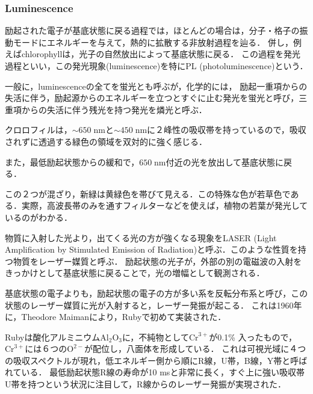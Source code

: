 \documentclass[uplatex, dvipdfmx]{jsreport}
\begin{document}
\subsubsection{Luminescence}
励起された電子が基底状態に戻る過程では，ほとんどの場合は，分子・格子の振動モードにエネルギーを与えて，熱的に拡散する非放射過程を辿る．
併し，例えばchlorophyllは，光子の自然放出によって基底状態に戻る．
この過程を発光過程といい，この発光現象(luminescence)を特にPL (photoluminescence)という．

\begin{definition}
    一般に，luminescenceの全てを蛍光とも呼ぶが，化学的には，
    励起一重項からの失活に伴う，励起源からのエネルギーを立つとすぐに止む発光を蛍光と呼び，三重項からの失活に伴う残光を持つ発光を燐光と呼ぶ．
\end{definition}

\begin{example}[chlorophyll]
    クロロフィルは，$\sim 650\;\mathrm{nm}$と$\sim 450\;\mathrm{nm}$に２峰性の吸収帯を持っているので，吸収されずに透過する緑色の領域を双対的に強く感じる．

    また，最低励起状態からの緩和で，$650\;\mathrm{nm}$付近の光を放出して基底状態に戻る．

    この２つが混ざり，新緑は黄緑色を帯びて見える．この特殊な色が若草色である．実際，高波長帯のみを通すフィルターなどを使えば，植物の若葉が発光しているのがわかる．
\end{example}

\begin{definition}[誘導放出]
    物質に入射した光より，出てくる光の方が強くなる現象をLASER (Light Amplification by Stimulated Emission of Radiation)と呼ぶ．このような性質を持つ物質をレーザー媒質と呼ぶ．
    励起状態の光子が，外部の別の電磁波の入射をきっかけとして基底状態に戻ることで，光の増幅として観測される．

    基底状態の電子よりも，励起状態の電子の方が多い系を反転分布系と呼び，この状態のレーザー媒質に光が入射すると，レーザー発振が起こる．
    これは1960年に，Theodore Maimanにより，Rubyで初めて実装された．
\end{definition}

\begin{example}[誘導放出による発光]
    Rubyは酸化アルミニウム$\mathrm{Al_2O_3}$に，不純物として$\mathrm{Cr}^{3+}$が0.1\% 入ったもので，$\mathrm{Cr}^{3+}$には６つの$\mathrm{O}^{2-}$が配位し，八面体を形成している．
    これは可視光域に４つの吸収スペクトルが現れ，低エネルギー側から順にR線，U帯，B線，Y帯と呼ばれている．
    最低励起状態R線の寿命が10 msと非常に長く，すぐ上に強い吸収帯U帯を持つという状況に注目して，R線からのレーザー発振が実現された．
\end{example}
\end{document}
